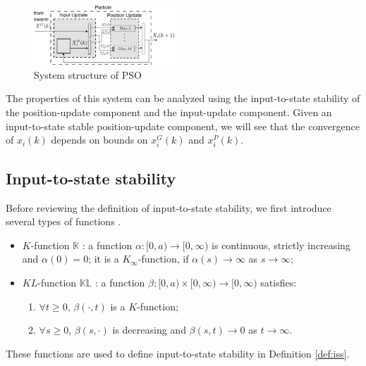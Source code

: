 \documentclass{sig-alternate}
\begin{document}
\begin{figure}
	\centering
	\includegraphics[width=0.47\textwidth]{particle_sys_flow.pdf}
	\caption{System structure of PSO}
	\label{fig:sys_flow}
\end{figure}

The properties of this system can be analyzed using the input-to-state stability of the position-update component and the input-update component. 
Given an input-to-state stable position-update component, we will see that the convergence of $ x_{i}(k) $ depends on bounds on $ x^{G}_{i}(k) $ and $ x^{P}_{i}(k) $.

\subsection{Input-to-state stability}
\label{sec:def_iss}

Before reviewing the definition of input-to-state stability, we first introduce several types of functions \cite{Jiang2001857}.
\begin{itemize}
	\item $ K $-function $ \mathbb{K} $ : a function $ \alpha  : [ 0, a ) \rightarrow [ 0, \infty ) $ is continuous, strictly increasing and $ \alpha (0) = 0 $; it is a $ K_{\infty} $-function, if $ \alpha (s) \rightarrow \infty $ as $ s \rightarrow \infty $;
	\item $ KL $-function $ \mathbb{KL} $ : a function $ \beta : [ 0, a ) \times [ 0 , \infty ) \rightarrow [ 0, \infty ) $ satisfies:
	\begin{enumerate}
		\item $ \forall t \geq 0 $, $ \beta (\cdot , t ) $ is a $ K $-function;
		\item $ \forall s \geq 0 $, $ \beta (s, \cdot) $ is decreasing and $ \beta(s,t) \rightarrow 0 $ as $ t \rightarrow \infty $.
	\end{enumerate}
\end{itemize}

These functions are used to define input-to-state stability in Definition \ref{def:iss}.
\end{document}
